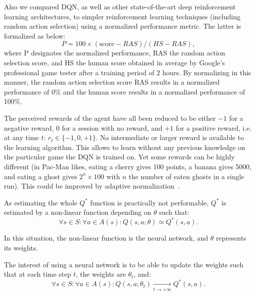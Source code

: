 \documentclass[letterpaper]{article}
\begin{document}
Also we compared DQN, as well as other state-of-the-art deep reinforcement learning architectures, to simpler reinforcement learning techniques (including
random action selection) using a normalized performance metric. The latter is formalized as below:
\begin{equation}
    P = 100 \times (\text{score} - RAS) / (HS - RAS),
\end{equation}
where P designates the normalized performance, RAS the random action selection score, and HS the human score obtained in average by Google's professional
game tester after a training period of 2 hours.  By normalizing in this manner, the random action selection score RAS results in a normalized performance
of 0\% and the human score results in a normalized performance of 100\%.

The perceived rewards of the agent have all been reduced to be either $-1$ for a negative reward, $0$ for a session with no reward, and $+1$
for a positive reward, i.e. at any time $t$: $r_t \in \{-1, 0, +1\}$. No intermediate or larger reward is available to the learning algorithm.
This allows to learn without any previous knowledge on the particular game the DQN is trained on. Yet some rewards can be highly different (in Pac-Man likes,
eating a cherry gives 100 points, a banana gives 5000, and eating a ghost gives $2^n \times 100$ with $n$ the number of eaten ghosts in a single run).
This could be improved by adaptive normalization~\citep{van2016learning}.

As estimating the whole $Q^*$ function is practically not performable, $Q^*$ is estimated by a non-linear function depending on $\theta$ such that:
\begin{equation}
	\forall s \in S : \forall a \in A(s) : Q(s, a; \theta) \simeq Q^*(s, a).
\end{equation}

In this situation, the non-linear function is the neural network, and $\theta$ represents its weights.

The interest of using a neural network is to be able to update the weights such that at each time step $t$, the weights are $\theta_t$, and:
\begin{equation}
	\forall s \in S : \forall a \in A(s) : Q(s, a; \theta_t) \xrightarrow[t \to +\infty]{} Q^*(s, a).
\end{equation}
\end{document}
